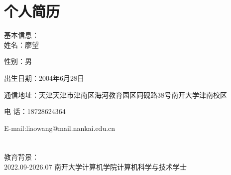

\chapter*{个人简历}

\noindent 基本信息：\\

 姓名：廖望

 性别：男 

 出生日期：2004年6月28日

 通信地址：天津天津市津南区海河教育园区同砚路38号南开大学津南校区

 电  话：18728624364

 E-mail:liaowang@mail.nankai.edu.cn \\ \\
\\
教育背景：\\  

2022.09-2026.07 \quad 南开大学\quad 计算机学院\quad\quad 计算机科学与技术\quad\quad 学士 \\ 
\\
